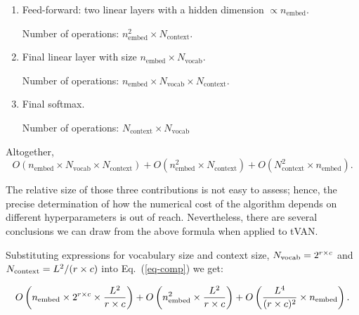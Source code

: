 \documentclass[3p, times,merge]{elsarticle}
\begin{document}
\begin{enumerate}
\begin{itemize}
    Number of operations: $n_{\text{embed}}^2 \times N_{\text{context}}$.
    \end{itemize}



    \item Feed-forward: two linear layers with a hidden dimension $\propto n_\text{embed}$.

    Number of operations: $n_{\text{embed}}^2 \times N_{\text{context}}$.
    \item Final linear layer with size $n_{\text{embed}} \times N_{\text{vocab}}$.
    
    Number of operations: $n_{\text{embed}} \times N_{\text{vocab}} \times N_{\text{context}}$.


    \item Final softmax.

    Number of operations: $N_{\text{context}} \times N_{\text{vocab}}$
\end{enumerate}

Altogether,
\begin{equation}
\label{eq-comp}
O\!\left(n_{\text{embed}} \times N_{\text{vocab}} \times N_{\text{context}}\right) + O\!\left(n_{\text{embed}}^2 \times N_{\text{context}} \right)+ O\!\left(N_{\text{context}}^2 \times n_{\text{embed}}\right).
\end{equation}

 The relative size of those three contributions is not easy to assess; hence, the precise determination of how the numerical cost of the algorithm depends on different hyperparameters is out of reach. Nevertheless, there are several conclusions we can draw from the above formula when applied to tVAN.



Substituting expressions for vocabulary size and context size, $N_{\rm vocab}=2^{r\times c}$ and  $N_{\rm context}=L^2/(r\times c)$ into Eq.~(\ref{eq-comp}) we get:

\begin{equation}
    O\left(n_{\rm embed} \times 2^{r\times c} \times \frac{L^2}{r\times c} \right)+ O\left(n_{\rm embed}^2 \times \frac{L^2}{r\times c} \right)+ 
    O\left(\frac{L^4}{(r\times c)^2} \times n_{\rm embed}\right).
    \label{scaling_formula}
\end{equation}
\end{document}

